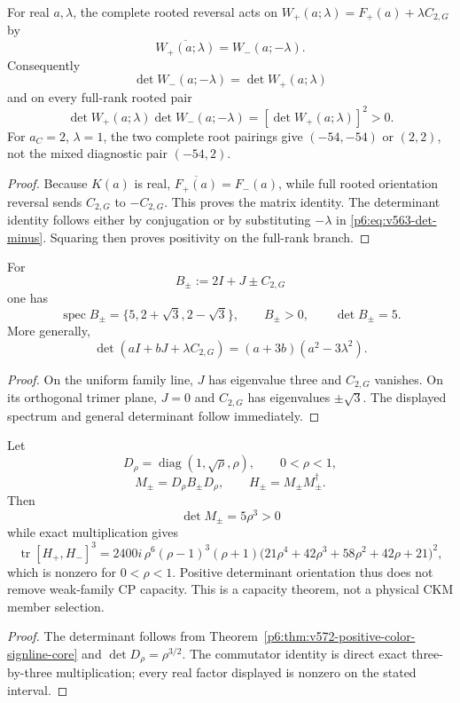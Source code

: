 \documentclass[11pt,a4paper]{article}
\begin{document}
\begin{proposition}
\label{p6:prop:v572-full-root-reversal-of-W}
For real \(a,\lambda\), the complete rooted reversal acts on
\(W_+(a;\lambda)=F_+(a)+\lambda C_{2,G}\) by
\[
 \boxed{\overline{W_+(a;\lambda)}=W_-(a;-\lambda).}
\]
Consequently
\[
 \boxed{\det W_-(a;-\lambda)=\det W_+(a;\lambda)}
\]
and on every full-rank rooted pair
\[
 \boxed{\det W_+(a;\lambda)\det W_-(a;-\lambda)
       =[\det W_+(a;\lambda)]^2>0.}
\]
For \(a_C=2\), \(\lambda=1\), the two complete root pairings give
\((-54,-54)\) or \((2,2)\), not the mixed diagnostic pair \((-54,2)\).
\end{proposition}
\begin{proof}
Because \(K(a)\) is real, \(\overline{F_+(a)}=F_-(a)\), while full rooted
orientation reversal sends \(C_{2,G}\) to \(-C_{2,G}\).  This proves the
matrix identity.  The determinant identity follows either by conjugation or
by substituting \(-\lambda\) in
\eqref{p6:eq:v563-det-minus}.  Squaring then proves positivity on the
full-rank branch.
\end{proof}

\begin{theorem}
\label{p6:thm:v572-positive-color-signline-core}
For
\[
 B_\pm:=2I+J\pm C_{2,G}
\]
one has
\[
 \boxed{\operatorname{spec}B_\pm=\{5,2+\sqrt3,2-\sqrt3\},
 \qquad B_\pm>0,
 \qquad \det B_\pm=5.}
\]
More generally,
\[
 \boxed{\det(aI+bJ+\lambda C_{2,G})
 =(a+3b)(a^2-3\lambda^2).}
\]
\end{theorem}
\begin{proof}
On the uniform family line, \(J\) has eigenvalue three and
\(C_{2,G}\) vanishes.  On its orthogonal trimer plane, \(J=0\) and
\(C_{2,G}\) has eigenvalues \(\pm\sqrt3\).  The displayed spectrum and
general determinant follow immediately.
\end{proof}

\begin{proposition}
\label{p6:prop:v572-positive-determinant-weak-cp-capacity}
Let
\[
 D_\rho=\operatorname{diag}(1,\sqrt\rho,\rho),\qquad 0<\rho<1,
\]
\[
 M_\pm=D_\rho B_\pm D_\rho,
 \qquad H_\pm=M_\pm M_\pm^\dagger.
\]
Then
\[
 \det M_\pm=5\rho^3>0
\]
while exact multiplication gives
\[
 \boxed{
 \operatorname{tr}[H_+,H_-]^3
 =2400i\,\rho^6(\rho-1)^3(\rho+1)
 \bigl(21\rho^4+42\rho^3+58\rho^2+42\rho+21\bigr)^2,}
\]
which is nonzero for \(0<\rho<1\).  Positive determinant orientation thus
does not remove weak-family CP capacity.  This is a capacity theorem, not a
physical CKM member selection.
\end{proposition}
\begin{proof}
The determinant follows from Theorem~\ref{p6:thm:v572-positive-color-signline-core}
and \(\det D_\rho=\rho^{3/2}\).  The commutator identity is direct exact
three-by-three multiplication; every real factor displayed is nonzero on the
stated interval.
\end{proof}
\end{document}
